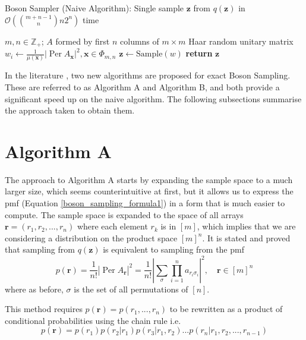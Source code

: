 \documentclass[ %
                    author={Manan Vaswani},
                supervisor={Dr. Raphael Clifford},
                    degree={MEng},
                     title={A multi-core CPU implementation of the classical Boson Sampling algorithm},
                  subtitle={},
                      type={},
                      year={2019} ]{dissertation}
\theoremstyle{plain}
\theoremstyle{definition}
\DeclareMathOperator*{\Per}{\mathrm{Per}}
\begin{document}
\begin{algorithm}
\caption{Boson Sampler (Naive Algorithm): Single sample $\mathbf{z}$ from $q(\mathbf{z})$ in $\mathcal{O}(\binom{m+n-1}{n} n 2^n)$ time}
\begin{algorithmic}[1] \label{alg:naive}
\Require $m, n \in \mathbb{Z}_+$; $A$ formed by first $n$ columns of $m \times m$ Haar random unitary matrix
\State $w_i \leftarrow \frac{1}{\mu(\mathbf{x})} \left| \Per A_\mathbf{x} \right| ^2, \mathbf{x} \in \Phi_{m,n}$ 
\State $\mathbf{z} \leftarrow \text{Sample}(w)$  
\State \textbf{return} $\mathbf{z}$
\end{algorithmic}
\end{algorithm}

In the literature \cite{clifford17}, two new algorithms are proposed for exact Boson Sampling. These are referred to as Algorithm A and Algorithm B, and both provide a significant speed up on the naive algorithm. The following subsections summarise the approach taken to obtain them.

\section{Algorithm A}
The approach to Algorithm A starts by expanding the sample space to a much larger size, which seems counterintuitive at first, but it allows us to express the pmf (Equation \ref{boson_sampling_formula1}) in a form that is much easier to compute. The sample space is expanded to the space of all arrays $\mathbf{r}=(r_1, r_2, ... , r_n)$ where each element $r_k$ is in $[m]$, which implies that we are considering a distribution on the product space $[m]^n$. It is stated and proved that sampling from $q(\mathbf{z})$ is equivalent to sampling from the pmf
\begin{equation} \label{eqn:algADistribution}
p(\mathbf{r}) = \frac{1}{n!} \left| \Per A_\mathbf{r} \right| ^2 = \frac{1}{n!} \left| \sum_\sigma \prod_{i=1}^n a_{r_i \sigma_i} \right| ^2 , \quad \mathbf{r} \in [m]^n 
\end{equation}
where as before, $\sigma$ is the set of all permutations of $[n]$.

This method requires $p(\mathbf{r}) = p(r_1, ... , r_n)$ to be rewritten as a product of conditional probabilities using the chain rule i.e.
\begin{equation}\label{eqn:bosonSamplingConditional}
p(\mathbf{r}) = p(r_1)p(r_2 | r_1) p (r_3 | r_1, r_2) ... p(r_n | r_1, r_2, ... , r_{n-1})
\end{equation}
\end{document}
